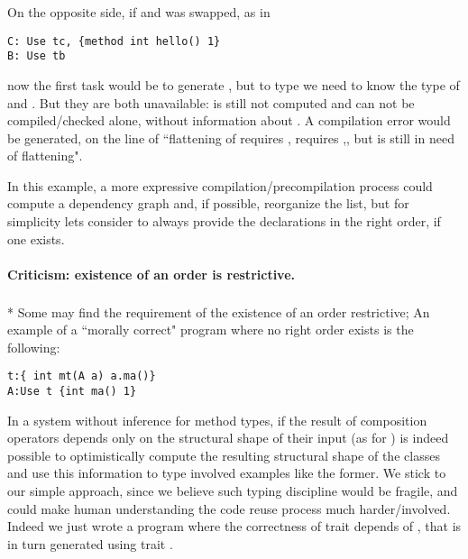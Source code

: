 On the opposite side, if \Q@B@ and \Q@C@ was swapped, as in
\begin{lstlisting}
C: Use tc, {method int hello() 1}  
B: Use tb
\end{lstlisting}

now the first task would be to generate \Q@C@, but 
to type \Q@tc@ we need to know the type of \Q@A@ and \Q@B@.
But they are both unavailable: \Q@B@ is still not computed and 
\Q@A@ can not be compiled/checked alone, without information about \Q@B@.
A compilation error would be generated, on the line of ``flattening of \Q@C@
requires \Q@tc@, \Q@tc@ requires \Q@A@,\Q@B@, but \Q@B@ is still in need of flattening".

In this example, a more expressive compilation/precompilation process 
could compute a dependency graph and, if possible, reorganize the list,
but for simplicity lets consider to always provide the declarations
in the right order, if one exists.

\paragraph*{Criticism: existence of an order is restrictive.}${}_{}$\\*
Some may find the requirement of the existence of an order restrictive;
An example of a ``morally correct" program where no right order exists is the following:
\begin{lstlisting}
t:{ int mt(A a) a.ma()}
A:Use t {int ma() 1}
\end{lstlisting}

In a system without inference for method types,
if the result of composition operators depends only on the
structural shape of their input (as for \use)
is indeed possible to optimistically compute the resulting structural shape of the classes
and use this information to type involved examples like the former.
We stick to our simple approach, since we believe such typing discipline would be fragile,
and could make human understanding the code reuse process much harder/involved.
Indeed we just wrote a program where the correctness of trait \Q@t@ depends of 
\Q@A@, that is in turn generated using trait \Q@t@.

